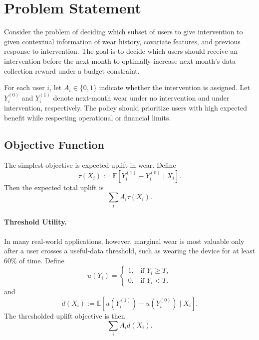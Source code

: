 \section{Problem Statement}

Consider the problem of deciding which subset of users to give intervention to given contextual information of wear history, covariate features, and previous response to intervention. The goal is to decide which users should receive an intervention before the next month to optimally increase next month's data collection reward under a budget constraint. 

For each user $i$, let $A_i \in \{0,1\}$ indicate whether the intervention is assigned. Let $Y_i^{(0)}$ and $Y_i^{(1)}$ denote next-month wear under no intervention and under intervention, respectively. The policy should prioritize users with high expected benefit while respecting operational or financial limits.



\subsection{Objective Function}
The simplest objective is expected uplift in wear. Define
\[
\tau(X_i) := \mathbb{E}\!\left[Y_i^{(1)} - Y_i^{(0)} \mid X_i\right].
\]
Then the expected total uplift is 
\[
\sum_i  A_i \tau(X_i).
\]
\paragraph{Threshold Utility.} In many real-world applications, however, marginal wear is most valuable only after a user crosses a useful-data threshold, such as wearing the device for at least $60\%$ of time. Define
\[
u(Y_i) = \begin{cases}
    1, & \text{if } Y_i \ge T, \\
    0, & \text{if } Y_i < T.
\end{cases}
\]
and 
\[
d(X_i) := \mathbb{E}\!\left[u(Y^{(1)}_i) - u(Y^{(0)}_i) \mid X_i\right].
\]
The thresholded uplift objective is then
\[
\sum_i A_i d(X_i).
\]
